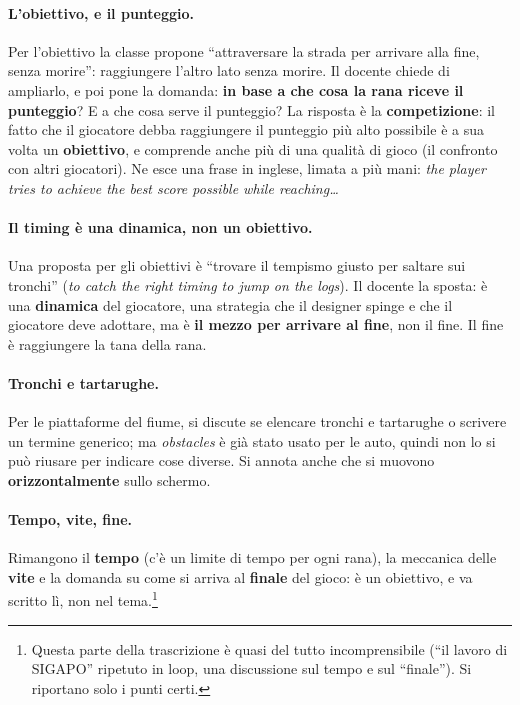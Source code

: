 \paragraph{L'obiettivo, e il punteggio.} Per l'obiettivo la classe propone
``attraversare la strada per arrivare alla fine, senza morire'': raggiungere
l'altro lato senza morire. Il docente chiede di ampliarlo, e poi pone la
domanda: \textbf{in base a che cosa la rana riceve il punteggio}? E a che cosa
serve il punteggio? La risposta è la \textbf{competizione}: il fatto che il
giocatore debba raggiungere il punteggio più alto possibile è a sua volta un
\textbf{obiettivo}, e comprende anche più di una qualità di gioco (il
confronto con altri giocatori). Ne esce una frase in inglese, limata a più
mani: \emph{the player tries to achieve the best score possible while
reaching\ldots}

\paragraph{Il timing è una dinamica, non un obiettivo.} Una proposta per gli
obiettivi è ``trovare il tempismo giusto per saltare sui tronchi'' (\emph{to
catch the right timing to jump on the logs}). Il docente la sposta: è una
\textbf{dinamica} del giocatore, una strategia che il designer spinge e che il
giocatore deve adottare, ma è \textbf{il mezzo per arrivare al fine}, non il
fine. Il fine è raggiungere la tana della rana.

\paragraph{Tronchi e tartarughe.} Per le piattaforme del fiume, si discute se
elencare tronchi e tartarughe o scrivere un termine generico; ma
\emph{obstacles} è già stato usato per le auto, quindi non lo si può
riusare per indicare cose diverse. Si annota anche che si muovono
\textbf{orizzontalmente} sullo schermo.

\paragraph{Tempo, vite, fine.} Rimangono il \textbf{tempo} (c'è un limite di
tempo per ogni rana), la meccanica delle \textbf{vite} e la domanda su come si
arriva al \textbf{finale} del gioco: è un obiettivo, e va scritto lì, non nel
tema.\footnote{Questa parte della trascrizione è quasi del tutto
incomprensibile (``il lavoro di SIGAPO'' ripetuto in loop, una discussione
sul tempo e sul ``finale''). Si riportano solo i punti certi.}


